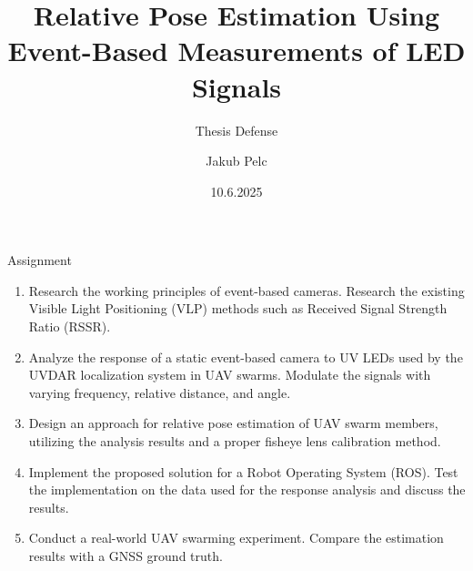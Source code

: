 \documentclass{beamer}
\title{Relative Pose Estimation Using Event-Based Measurements of LED Signals}
\subtitle{Thesis Defense}
\date{10.6.2025}
\author{Jakub Pelc}
\institute{Faculty of Electrical Engineering, Czech Technical University in Prague \\ Multi-robot Systems Group}
\begin{document}
\maketitle

\begin{frame}{Assignment}

\small{
\begin{enumerate}
    \item Research the working principles of event-based cameras. Research the existing Visible Light Positioning (VLP) methods such as Received Signal Strength Ratio (RSSR).
    \item Analyze the response of a static event-based camera to UV LEDs used by the UVDAR localization system in UAV swarms. Modulate the signals with varying frequency, relative distance, and angle.
    \item Design an approach for relative pose estimation of UAV swarm members, utilizing the analysis results and a proper
fisheye lens calibration method.
    \item Implement the proposed solution for a Robot Operating System (ROS). Test the implementation on the data used for
the response analysis and discuss the results.
    \item Conduct a real-world UAV swarming experiment. Compare the estimation results with a GNSS ground truth. 
\end{enumerate}
}

\end{frame}

\end{document}
